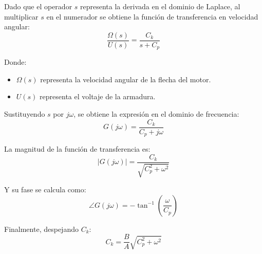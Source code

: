 \documentclass{article}          %
\begin{document}
        Dado que el operador \( s \) representa la derivada en el dominio de Laplace, al multiplicar \( s \) en el numerador se obtiene la función de transferencia en velocidad angular:
        \begin{equation}
        \frac{\Omega(s)}{U(s)} = \frac{C_k}{s + C_p}
        \end{equation}

        Donde:
        \begin{itemize}
            \item \( \Omega(s) \) representa la velocidad angular de la flecha del motor.
            \item \( U(s) \) representa el voltaje de la armadura.
        \end{itemize}

        Sustituyendo \( s \) por \( j\omega \), se obtiene la expresión en el dominio de frecuencia:
        \begin{equation}
        G(j\omega) = \frac{C_k}{C_p + j\omega}
        \end{equation}

        La magnitud de la función de transferencia es:
        \begin{equation}
        |G(j\omega)| = \frac{C_k}{\sqrt{C_p^2 + \omega^2}}
        \end{equation}

        Y su fase se calcula como:
        \begin{equation}
        \angle G(j\omega) = -\tan^{-1} \left( \frac{\omega}{C_p} \right)
        \end{equation}

        Finalmente, despejando \( C_k \):
        \begin{equation}
        C_k = \frac{B}{A} \sqrt{C_p^2 + \omega^2}
        \label{equ:8}
        \end{equation}
\end{document}

